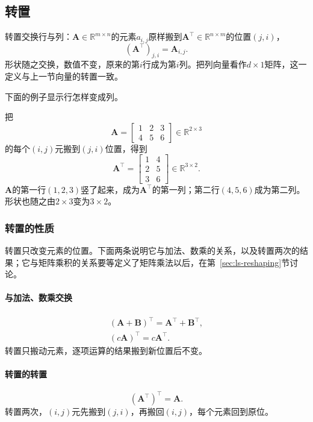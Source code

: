 \subsection{转置}
\label{sec:ls-matrix-transpose}

转置交换行与列：$\bm A\in\mathbb R^{m\times n}$的元素$a_{i,j}$原样搬到$\bm A^\top\in\mathbb R^{n\times m}$的位置$(j,i)$，
\begin{equation}
 (\bm A^\top)_{j,i}=\bm A_{i,j}.
 \label{eq:ls-matrix-transpose}
\end{equation}
形状随之交换，数值不变，原来的第$i$行成为第$i$列。把列向量看作$d\times1$矩阵，这一定义与上一节向量的转置一致。

下面的例子显示行怎样变成列。
\begin{example}
\label{ex:ls-transpose-two-by-three}
把
\[
 \bm A=\begin{bmatrix}1&2&3\\4&5&6\end{bmatrix}\in\mathbb R^{2\times3}
\]
的每个$(i,j)$元搬到$(j,i)$位置，得到
\[
 \bm A^\top=\begin{bmatrix}1&4\\2&5\\3&6\end{bmatrix}\in\mathbb R^{3\times2}.
\]
$\bm A$的第一行$(1,2,3)$竖了起来，成为$\bm A^\top$的第一列；第二行$(4,5,6)$成为第二列。形状也随之由$2\times3$变为$3\times2$。
\end{example}

\subsubsection{转置的性质}

转置只改变元素的位置。下面两条说明它与加法、数乘的关系，以及转置两次的结果；它与矩阵乘积的关系要等定义了矩阵乘法以后，在第~\ref{sec:ls-reshaping}节讨论。

\paragraph{与加法、数乘交换}
\[
 \begin{gathered}
(\bm A+\bm B)^\top=\bm A^\top+\bm B^\top,\\
(c\bm A)^\top=c\bm A^\top.
 \end{gathered}
\]
转置只搬动元素，逐项运算的结果搬到新位置后不变。

\paragraph{转置的转置}
\[
 (\bm A^\top)^\top=\bm A.
\]
转置两次，$(i,j)$元先搬到$(j,i)$，再搬回$(i,j)$，每个元素回到原位。


